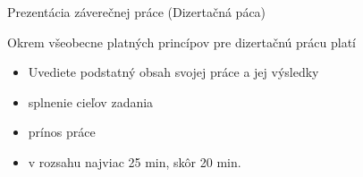 \documentclass{beamer}
\begin{document}
\begin{frame}{Prezentácia záverečnej práce (Dizertačná páca)}

Okrem všeobecne platných princípov pre dizertačnú prácu platí

\begin{itemize}
 \item Uvediete podstatný obsah svojej práce a jej výsledky
 \item splnenie cieľov zadania
 \item prínos práce
 \item v rozsahu najviac 25 min, skôr 20 min.
\end{itemize}
\end{frame}



\end{document}
